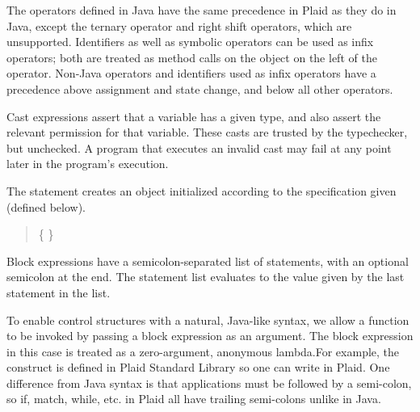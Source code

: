 The operators defined in Java have the same precedence in Plaid as
they do in Java, except the ternary operator and right shift operators, 
which are unsupported.  Identifiers as well as symbolic operators can be
used as infix operators; both are treated as method calls on the
object on the left of the operator.  Non-Java operators and
identifiers used as infix operators have a precedence above assignment
and state change, and below all other operators.

Cast expressions assert that a variable has a given type, and
also assert the relevant permission for that variable.  These casts
are trusted by the typechecker, but unchecked. A program that executes 
an invalid cast may fail at any point later in the program's 
execution.

\begin{quote}


 {}

 {} 

 {}

\end{quote}

The  statement creates an object initialized according to the
 specification given (defined below).

\begin{quote}


 \{  \}


 {}  \opt{;}

\end{quote}

Block expressions have a semicolon-separated list of statements, with
an optional semicolon at the end.  The statement list evaluates to the
value given by the last statement in the list.

\begin{quote}


 {}

 {} 

\end{quote}

To enable control structures with a natural, Java-like syntax, we allow
a function to be invoked by passing a block expression as an argument. The block expression in this 
case is treated as a zero-argument, anonymous lambda.For example, the  construct is defined in 
Plaid Standard Library so one can write  in Plaid. One 
difference from Java syntax is that applications must be followed by a semi-colon, so if, match, 
while, etc. in Plaid all have trailing semi-colons unlike in Java.


